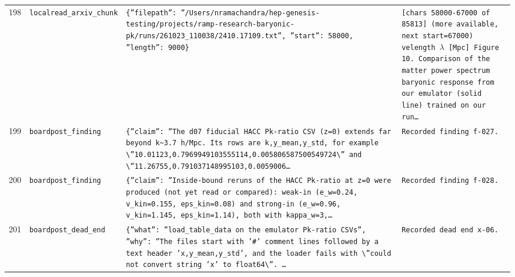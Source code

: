 \documentclass[11pt,a4paper]{article}
\begin{document}
\begin{longtable}{@{}p{}p{}p{}p{}@{}}
198 & \texttt{local}\newline\texttt{read\_\allowbreak{}arxiv\_\allowbreak{}chunk} & \texttt{\{''filepath'':\allowbreak{} ''/\allowbreak{}Users/\allowbreak{}nramachandra/\allowbreak{}hep-genesis-testing/\allowbreak{}projects/\allowbreak{}ramp-research-baryonic-pk/\allowbreak{}runs/\allowbreak{}261023\_\allowbreak{}110038/\allowbreak{}2410.17109.txt'',\allowbreak{} ''start'':\allowbreak{} 58000,\allowbreak{} ''length'':\allowbreak{} 9000\}\allowbreak{}} & \texttt{[chars 58000-67000 of 85813]\allowbreak{} (more available,\allowbreak{} next start=\allowbreak{}67000)\allowbreak{}  velength $\lambda$ [Mpc]\allowbreak{} Figure 10. Comparison of the matter power spectrum baryonic response from our emulator (solid line)\allowbreak{} trained on our run\ldots{}\allowbreak{}} \\
199 & \texttt{board}\newline\texttt{post\_\allowbreak{}finding} & \texttt{\{''claim'':\allowbreak{} ''The d07 fiducial HACC Pk-ratio CSV (z=\allowbreak{}0)\allowbreak{} extends far beyond k\textasciitilde{}\allowbreak{}3.7 h/\allowbreak{}Mpc. Its rows are k,\allowbreak{}y\_\allowbreak{}mean,\allowbreak{}y\_\allowbreak{}std,\allowbreak{} for example \textbackslash{}\allowbreak{}''10.01123,\allowbreak{}0.7969949103555114,\allowbreak{}0.005806587500549724\textbackslash{}\allowbreak{}'' and \textbackslash{}\allowbreak{}''11.26755,\allowbreak{}0.791037148995103,\allowbreak{}0.0059006\ldots{}\allowbreak{}} & \texttt{Recorded finding f-027.} \\
200 & \texttt{board}\newline\texttt{post\_\allowbreak{}finding} & \texttt{\{''claim'':\allowbreak{} ''Inside-bound reruns of the HACC Pk-ratio at z=\allowbreak{}0 were produced (not yet read or compared)\allowbreak{}:\allowbreak{} weak-in (e\_\allowbreak{}w=\allowbreak{}0.24,\allowbreak{} v\_\allowbreak{}kin=\allowbreak{}0.155,\allowbreak{} eps\_\allowbreak{}kin=\allowbreak{}0.08)\allowbreak{} and strong-in (e\_\allowbreak{}w=\allowbreak{}0.96,\allowbreak{} v\_\allowbreak{}kin=\allowbreak{}1.145,\allowbreak{} eps\_\allowbreak{}kin=\allowbreak{}1.14)\allowbreak{},\allowbreak{} both with kappa\_\allowbreak{}w=\allowbreak{}3,\allowbreak{}\ldots{}\allowbreak{}} & \texttt{Recorded finding f-028.} \\
201 & \texttt{board}\newline\texttt{post\_\allowbreak{}dead\_\allowbreak{}end} & \texttt{\{''what'':\allowbreak{} ''load\_\allowbreak{}table\_\allowbreak{}data on the emulator Pk-ratio CSVs'',\allowbreak{} ''why'':\allowbreak{} ''The files start with '\#' comment lines followed by a text header 'x,\allowbreak{}y\_\allowbreak{}mean,\allowbreak{}y\_\allowbreak{}std',\allowbreak{} and the loader fails with \textbackslash{}\allowbreak{}''could not convert string 'x' to float64\textbackslash{}\allowbreak{}''. \ldots{}\allowbreak{}} & \texttt{Recorded dead end x-06.} \\

\end{longtable}
\end{document}
